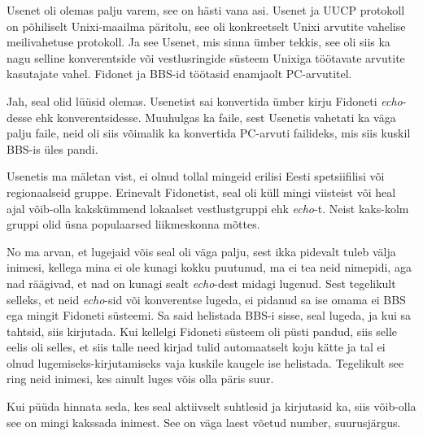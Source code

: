 
Usenet oli olemas palju varem, see on hästi vana asi. Usenet ja UUCP protokoll 
on põhiliselt  Unixi-maailma päritolu,  see oli konkreetselt 
Unixi arvutite vahelise meilivahetuse protokoll. Ja see Usenet, mis  sinna 
ümber tekkis,  see oli siis ka nagu selline konverentside või vestlusringide 
süsteem Unixiga töötavate arvutite kasutajate vahel. Fidonet ja BBS-id töötasid
enamjaolt PC-arvutitel.


Jah, seal olid lüüsid olemas. Usenetist sai konvertida ümber kirju Fidoneti 
\emph{echo}-desse ehk konverentsidesse. Muuhulgas ka faile, sest 
Usenetis vahetati ka väga palju faile,  neid oli siis võimalik ka konvertida 
PC-arvuti failideks, mis siis kuskil BBS-is üles pandi.


Usenetis ma mäletan vist, ei olnud tollal mingeid erilisi Eesti spetsiifilisi või 
regionaalseid gruppe. Erinevalt Fidonetist, seal oli küll mingi viisteist või 
heal ajal võib-olla kakskümmend lokaalset  vestlustgruppi ehk \emph{echo}-t. 
Neist kaks-kolm gruppi olid üsna populaarsed liikmeskonna mõttes.


No ma arvan, et lugejaid võis seal oli väga palju, sest ikka pidevalt tuleb välja 
inimesi, kellega mina ei ole kunagi kokku puutunud, ma ei tea neid nimepidi, 
aga nad räägivad, et nad on kunagi sealt \emph{echo}-dest  midagi lugenud. Sest 
tegelikult selleks, et neid \emph{echo}-sid või konverentse lugeda,  ei pidanud 
sa ise omama ei BBS ega mingit Fidoneti süsteemi. Sa said helistada BBS-i 
sisse, seal lugeda, ja kui sa tahtsid, siis kirjutada. Kui kellelgi Fidoneti süsteem 
oli püsti pandud, siis selle eelis oli selles, et siis talle need kirjad tulid 
automaatselt koju kätte ja tal ei olnud lugemiseks-kirjutamiseks vaja kuskile 
kaugele ise helistada. Tegelikult see ring  neid inimesi, kes  ainult luges 
võis olla päris suur. 

Kui püüda hinnata seda, kes seal aktiivselt suhtlesid ja kirjutasid ka, siis  
võib-olla see on mingi kakssada inimest. See on väga laest võetud number, 
suurusjärgus.


